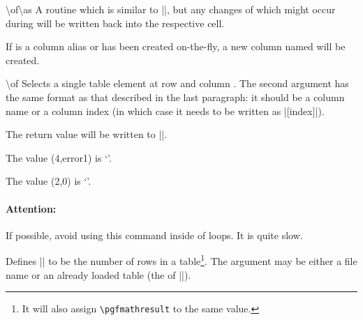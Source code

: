 \begin{command}{\pgfplotstablemodifyeachcolumnelement{}\textbackslash of\textbackslash as}
	A routine which is similar to |\pgfplotstableforeachcolumnelement|,
	but any changes of  which might occur during  will be written back into the respective cell.

\begin{codeexample}[]
\loadedtable
{}\of\loadedtable\as\cell{%
	\edef\cell{\#\pgfplotstablerow: \cell}%
}
\pgfplotstabletypeset[columns=error1,string type]{\loadedtable}
\end{codeexample}

	If  is a column alias or has been created on-the-fly, a new column named  will be created.
\end{command}

\begin{command}{\pgfplotstablegetelem{}\textbackslash of}
	Selects a single table element at row  and column . The second argument has the same format as that described in the last paragraph: it should be a column name or a column index (in which case it needs to be written as |[index]|).

	The return value will be written to |\pgfplotsretval|.
\begin{codeexample}[]
\of{\loadedtable}
The value (4,error1) is `\pgfplotsretval'. 

\of{\loadedtable}
The value (2,0) is `\pgfplotsretval'.
\end{codeexample}

	\paragraph{Attention:} If possible, avoid using this command inside of loops. It is quite slow.
\end{command}

\begin{command}{\pgfplotstablegetrowsof{}}
	Defines |\pgfplotsretval| to be the number of rows in a table\footnote{It will also assign \texttt{\textbackslash pgfmathresult} to the same value.}. The argument may be either a file name or an already loaded table (the  of |\pgfplotstableread|).
\end{command}


